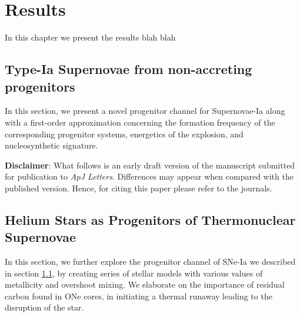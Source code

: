 \documentclass[../../main/thesis_msc.tex]{subfiles}
\begin{document}
	\chapter{Results}
	
	
	In this chapter we present the results blah blah
	
	\newpage
	
	\null\newpage
	
	
	\section{Type-Ia Supernovae from non-accreting progenitors}\label{sec:results1}
	
	
		\vspace{3cm}
		
		 In this section, we present a novel progenitor channel for Supernovae-Ia along with a first-order approximation concerning the formation frequency of the corresponding progenitor systems, energetics of the explosion, and nucleosynthetic signature.
		
		\vspace{15cm}
		\noindent \textbf{Disclaimer}: What follows is an early draft version of the manuscript submitted for publication to \textit{ApJ Letters}. Differences may appear when compared with the published version. Hence, for citing this paper please refer to the journals.
		
		\newpage
	
		
            
           
            
            
     \null\newpage
     \section{Helium Stars as Progenitors of Thermonuclear Supernovae}\label{sec:results2}
     
     
    	 \vspace{3cm}
		
		In this section, we further explore the progenitor channel of SNe-Ia we described in section \ref{sec:results1}, by creating series of stellar models with various values of metallicity and overshoot mixing. We elaborate on the importance of residual carbon found in ONe cores, in initiating a thermal runaway leading to the disruption of the star.
		
\end{document}

